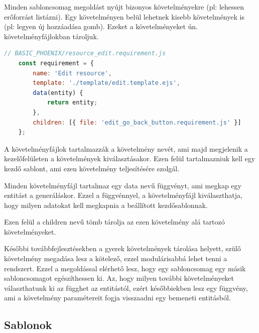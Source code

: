 \documentclass[a4paper,12pt,oneside]{report}
\begin{document}
\begin{justify}

	Minden sabloncsomag megoldást nyújt bizonyos követelményekre (pl: lehessen erőforrást listázni). Egy követelményen belül lehetnek kisebb követelmények is (pl: legyen új hozzáadása gomb). Ezeket a követelményeket ún. követelményfájlokban tároljuk. 

	\begin{lstlisting}[language=javascript]
	// BASIC_PHOENIX/resource_edit.requirement.js
	const requirement = {
		name: 'Edit resource',
		template: './template/edit.template.ejs',
		data(entity) {
			return entity;
		},
		children: [{ file: 'edit_go_back_button.requirement.js' }]
	};
	\end{lstlisting}

	A követelményfájlok tartalmazzák a követelmény nevét, ami majd megjelenik a kezelőfelületen a követelmények kiválasztásakor. Ezen felül tartalmazniuk kell egy kezdő sablont, ami ezen követelmény teljesítésére szolgál.

	Minden követelményfájl tartalmaz egy data nevű függvényt, ami megkap egy entitást a generáláskor. Ezzel a függvénnyel, a követelményfájl kiválaszthatja, hogy milyen adatokat kell megkapnia a beállított kezdősablonnak. 

	Ezen felül a children nevű tömb tárolja az ezen követelmény alá tartozó követelményeket. 

	Későbbi továbbfejlesztésekben a gyerek követelmények tárolása helyett, szülő követelmény megadása lesz a kötelező, ezzel modulárisabbá lehet tenni a rendszert. Ezzel a megoldással elérhető lesz, hogy egy sabloncsomag egy másik sabloncsomagot egészíthessen ki. Az, hogy milyen további követelményeket választhatunk ki az függhet az entitástól, ezért későbbiekben lesz egy függvény, ami a követelmény paramétereit fogja visszaadni egy bemeneti entitásból. 

\end{justify}

\newpage
\subsection{Sablonok}
\end{document}

